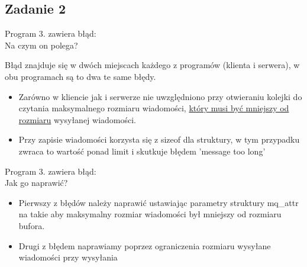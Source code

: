 \documentclass[a4paper,15pt]{article}
\newcommand{\ask}[2]{
    \begin{tcolorbox}[colback=black!5!white,colframe=gray,title={Pytanie #1}]
        #2
    \end{tcolorbox}
}
\begin{document}
\subsection{Zadanie 2}

\ask{- Zadanie 2.1}{ 
Program 3. zawiera błąd: \\
Na czym on polega?
}

Błąd znajduje się w dwóch miejscach każdego z programów  (klienta i serwera), w obu programach są to dwa te same błędy.
\begin{itemize}
\item Zarówno w kliencie jak i serwerze nie uwzględniono przy otwieraniu kolejki do czytania maksymalnego rozmiaru wiadomości, \underline{który musi być mniejszy od rozmiaru} wysyłanej wiadomości.
\item Przy zapisie wiadomości korzysta się z sizeof dla struktury, w tym przypadku zwraca to wartość ponad limit i skutkuje błędem 'message too long'
\end{itemize}


\ask{- Zadanie 2.2}{ 
Program 3. zawiera błąd: \\
Jak go naprawić?
}
\begin{itemize}
\item Pierwszy z błędów należy naprawić ustawiając parametry struktury mq\_attr na takie aby maksymalny rozmiar wiadomości był mniejszy od rozmiaru bufora. 
\item Drugi z błędem naprawiamy poprzez ograniczenia rozmiaru wysyłane wiadomości przy wysyłania
\end{itemize}
\end{document}
